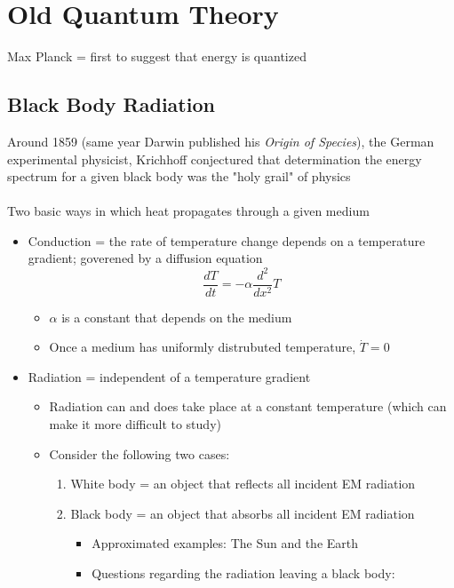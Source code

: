 \documentclass[a4paper]{article}
\begin{document}
\section{Old Quantum Theory}
Max Planck = first to suggest that energy is quantized 
\subsection{Black Body Radiation}
Around 1859 (same year Darwin published his \textit{Origin of Species}), the German experimental physicist, Krichhoff conjectured that determination the energy spectrum for a given black body was the "holy grail" of physics 
\\
\\
Two basic ways in which heat propagates through a given medium
    \begin{itemize}
        \item Conduction = the rate of temperature change depends on a temperature gradient; goverened by a diffusion equation
            \begin{equation}
                \frac{dT}{dt} = -\alpha \frac{d^2}{dx^2}T
            \end{equation}
            \begin{itemize}
                \item $\alpha$ is a constant that depends on the medium
                \item Once a medium has uniformly distrubuted temperature, $\Dot{T}=0$
            \end{itemize}
        \item Radiation = independent of a temperature gradient
            \begin{itemize}
                \item Radiation can and does take place at a constant temperature (which can make it more difficult to study)
                \item Consider the following two cases:
                    \begin{enumerate}
                        \item White body = an object that reflects all incident EM radiation
                        \item Black body = an object that absorbs all incident EM radiation
                            \begin{itemize}
                                \item Approximated examples: The Sun and the Earth
                                \item Questions regarding the radiation leaving a black body:

\end{itemize}
\end{enumerate}
\end{itemize}
\end{itemize}
\end{document}

